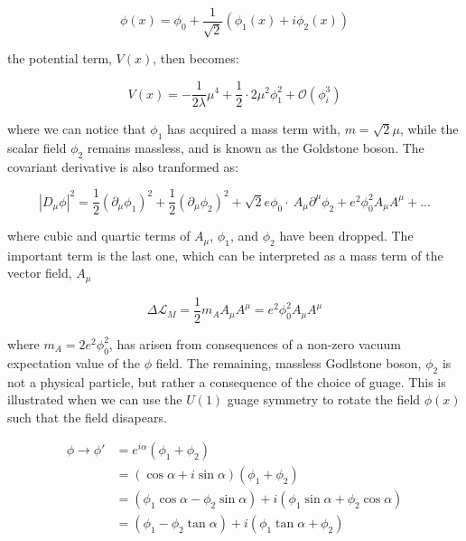 \begin{equation}\label{eq:abelian_higgs_mechanism_expanded_phi}
\phi(x) = \phi_{0} + \frac{1}{\sqrt{2}}(\phi_{1}(x) + i\phi_{2}(x))
\end{equation}

\noindent the potential term, $V(x)$, then becomes:

\begin{equation}\label{eq:abelian_higgs_mechanism_expanded_pot}
V(x) = -\frac{1}{2\lambda}\mu^{4} +
\frac{1}{2}\cdot2\mu^{2}\phi_{1}^{2} + \mathcal{O}(\phi_{i}^{3})
\end{equation}

\noindent where we can notice that $\phi_{1}$ has acquired a mass term
with, $m = \sqrt{2}\mu$, while the scalar field $\phi_{2}$ remains
massless, and is known as the Goldstone boson.  The covariant
derivative is also tranformed as:

\begin{equation}\label{eq:abelian_higgs_mechanism_expanded_covDer}
|D_{\mu}\phi|^{2} = \frac{1}{2}(\partial_{\mu}\phi_{1})^{2} +
\frac{1}{2}(\partial_{\mu}\phi_{2})^{2} +
\sqrt{2}e\phi_{0}\cdot~A_{\mu}\partial^{\mu}\phi_{2} +
e^{2}\phi_{0}^{2}A_{\mu}A^{\mu} + ...
\end{equation}

\noindent where cubic and quartic terms of $A_{\mu}$, $\phi_{1}$,
and $\phi_{2}$ have been dropped.  The important term is the last one,
which can be interpreted as a mass term of the vector field, $A_{\mu}$

\begin{equation}\label{eq:abelian_higgs_mechanism_mass_term_Amu}
\Delta\mathcal{L}_{M} =
  \frac{1}{2}m_{A}A_{\mu}A^{\mu} = e^{2}\phi_{0}^{2}A_{\mu}A^{\mu}
\end{equation}

\noindent where $m_{A} = 2e^{2}\phi_{0}^{2}$, has arisen from
consequences of a non-zero vacuum expectation value of the $\phi$
field.  The remaining, massless Godlstone boson, $\phi_{2}$ is not a
physical particle, but rather a consequence of the choice of guage.
This is illustrated when we can use the $U(1)$ guage symmetry to rotate
the field $\phi(x)$ such that the field disapears.  

\begin{equation}\label{eq:abelian_higgs_mechanism_rotate_phi2}
\begin{aligned}
 \phi \rightarrow \phi' & = e^{i\alpha}(\phi_{1} + \phi_{2}) \\
& = (\cos{\alpha} + i\sin{\alpha})(\phi_{1} + \phi_{2}) \\
& = (\phi_{1}\cos{\alpha} - \phi_{2}\sin{\alpha}) +
i(\phi_{1}\sin{\alpha} + \phi_{2}\cos{\alpha}) \\
& = (\phi_{1} - \phi_{2}\tan{\alpha}) + i(\phi_{1}\tan{\alpha} +
\phi_{2})
\end{aligned}
\end{equation}


